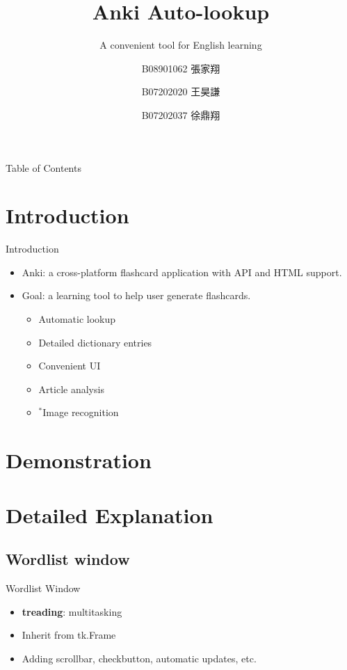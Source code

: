 \documentclass{beamer}
\title{Anki Auto-lookup}
\subtitle{A convenient tool for English learning}
\author[張家翔, 王昊謙, 徐鼎翔]
{B08901062 張家翔\inst{1} \and 
B07202020 王昊謙\inst{2} \and 
B07202037 徐鼎翔 \inst{2}}
\institute[NTU] %
{
	\inst{1}%
	Department of Electrical Engineering\\
	National Taiwan University
	\and
	\inst{2}%
	Department of Physics\\
	National Taiwan University
}
\begin{document}
\frame{\titlepage} 

\begin{frame}{Table of Contents}
	\tableofcontents
\end{frame}

\section{Introduction}%

\begin{frame}{Introduction}
	\begin{itemize}
		\item Anki: a cross-platform flashcard application with API and HTML support.
		\item Goal: a learning tool to help user generate flashcards.
			\begin{itemize}
				\item Automatic lookup
				\item Detailed dictionary entries
				\item Convenient UI
				\item Article analysis
				\item $^*$Image recognition
			\end{itemize}
	\end{itemize}
\end{frame}
\section{Demonstration}%



\section{Detailed Explanation}%

\subsection{Wordlist window}%

\begin{frame}{Wordlist Window}
	\begin{itemize}
		\item \textbf{treading}: multitasking
		\item Inherit from tk.Frame
		\item Adding scrollbar, checkbutton, automatic updates, etc.
	\end{itemize}
\end{frame}
\end{document}
